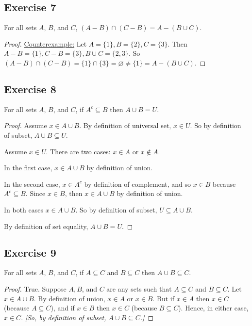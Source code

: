 \documentclass[14pt]{extarticle}
\newcommand{\es}{\varnothing}
\begin{document}
\subsection{Exercise 7}
For all sets $A$, $B$, and $C$, \((A - B) \cap (C - B) = A - (B \cup C)\).

\begin{proof}
\underline{Counterexample:} 
Let \(A = \{1\}, B = \{2\}, C = \{3\}\). Then \(A-B= \{1\}, C - B = \{3\}, B \cup C = \{2, 3\}\). 
So \((A - B) \cap (C - B) = \{1\} \cap \{3\} = \es \neq \{1\} = A - (B \cup C)\).
\end{proof}

\subsection{Exercise 8}
For all sets $A$, $B$, and $C$, if \(A^c \subseteq B\) then \(A \cup B = U\).

\begin{proof}
Assume \(x \in A \cup B\). By definition of universal set, \(x \in U\). 
So by definition of subset, \(A \cup B \subseteq U\).

Assume \(x \in U\). There are two cases: $x \in A$ or $x \notin A$. 

In the first case, $x \in A \cup B$ by definition of union. 

In the second case, $x \in A^c$ by definition of complement, and so $x \in B$ because \(A^c \subseteq B\). 
Since $x \in B$, then \(x \in A \cup B\) by definition of union.

In both cases \(x \in A \cup B\). So by definition of subset, \(U \subseteq A \cup B\).

By definition of set equality, \(A \cup B = U\).
\end{proof}

\subsection{Exercise 9}
For all sets $A$, $B$, and $C$, if \(A \subseteq C\) and \(B \subseteq C\) then \(A \cup B \subseteq C\).

\begin{proof}
True. Suppose $A, B$, and $C$ are any sets such that \(A \subseteq C\) and \(B \subseteq C\). Let \(x \in A \cup B\). 
By definition of union, \(x \in A\) or \(x \in B\). But if \(x \in A\) then \(x \in C\) (because \(A \subseteq C\)), 
and if \(x \in B\) then \(x \in C\) (because \(B \subseteq C\)). Hence, in either case, \(x \in C\). {\it [So, by 
definition of subset, \(A \cup B \subseteq C\).]}
\end{proof}
\end{document}
